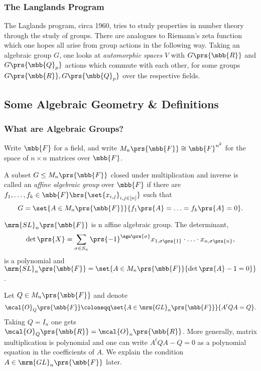 \documentclass[10pt,a4paper,twoside,openany,hidelinks]{book}
\begin{document}
\subsubsection{The Langlands Program}

The Laglands program, circa 1960, tries to study properties in number theory through the study of groups. There are analogues to Riemann's zeta function which one hopes all arise from group actions in the following way.
Taking an algebraic group $G$, one looks at \emph{automorphic spaces} $V$ with $G\prs{\mbb{R}}$ and $G\prs{\mbb{Q}_p}$ actions which commute with each other, for some groups $G\prs{\mbb{R}}, G\prs{\mbb{Q}_p}$ over the respective fields.

\subsection{Some Algebraic Geometry \& Definitions}

\subsubsection{What are Algebraic Groups?}

Write $\mbb{F}$ for a field, and write $M_n\prs{\mbb{F}} \cong \mbb{F}^{n^2}$ for the space of $n \times n$ matrices over $\mbb{F}$.

\begin{definition}
A subset $G \leq M_n\prs{\mbb{F}}$ closed under multiplication and inverse is called an \emph{affine algebraic group} over $\mbb{F}$ if there are $f_1, \ldots, f_k \in \mbb{F}\brs{\set{x_{i,j}}_{i,j \in [n]}}$ such that
\[G = \set{A \in M_n\prs{\mbb{F}}}{f_1\prs{A} = \ldots = f_k\prs{A} = 0} \text{.}\]
\end{definition}

\begin{example}
$\mrm{SL}_n\prs{\mbb{F}}$ is n affine algebraic group. The determinant,
\[\det\prs{X} = \sum_{\sigma \in S_n} \prs{-1}^{\sgn\prs{\sigma}} x_{1,\sigma\prs{1}} \cdot \ldots \cdot x_{n,\sigma\prs{n}} \text{,}\]
is a polynomial and $\mrm{SL}_n\prs{\mbb{F}} = \set{A \in M_n\prs{\mbb{F}}{\det\prs{A} - 1 = 0}}$.
\end{example}

\begin{example}
Let $Q \in M_n\prs{\mbb{F}}$ and denote
\[\mcal{O}_{Q}\prs{\mbb{F}} \coloneqq \set{A \in \mrm{GL}_n\prs{\mbb{F}}}{A^t Q A = Q} \text{.}\]
Taking $Q = I_n$ one gets $\mcal{O}_Q\prs{\mbb{R}} = \mcal{O}_n\prs{\mbb{R}}$. More generally, matrix multiplication is polynomial and one can write $A^t Q A - Q = 0$ as a polynomial equation in the coefficients of $A$. We explain the condition $A \in \mrm{GL}_n\prs{\mbb{F}}$ later.
\end{example}
\end{document}
